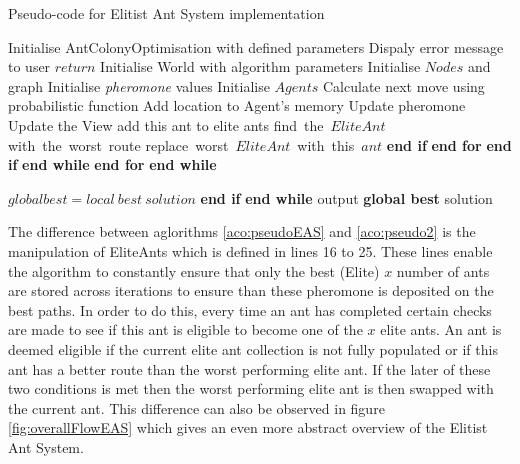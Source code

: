 \begin{algorithm}[H]
\caption[Eltist Ant System Pseudo-code]{Pseudo-code for Elitist Ant System implementation}
\label{aco:pseudoEAS}
\begin{algorithmic}[1]
\State Initialise AntColonyOptimisation with defined parameters
\State Dispaly error message to user
\State $return$
\EndIf
\State Initialise World with algorithm parameters
\State Initialise $Nodes$ and graph
\State Initialise \textit{pheromone} values
\State Initialise $Agents$
\State Calculate next move using probabilistic function 
\State Add location to Agent's memory
\State Update pheromone
\State Update the View
\EndWhile 
{}
\State add this ant to elite ants
\Else 
{}
\State find\ the\ $Elite Ant$ with\ the\ worst\ route
\State replace\ worst\ $Elite Ant$\ with\ this\ $ant$ 
\EndIf
\State \textbf{end if} 
\EndFor 
\State \textbf{end for}
\EndIf 
\State \textbf{end if}
\State \textbf{end while}
\EndFor 
\State \textbf{end for}
\EndWhile 
\State \textbf{end while}

\State $global best = local\ best\ solution$
\EndIf
\State \textbf{end if}
\State \textbf{end while}
\State output \textbf{global best} solution
\end{algorithmic}
\end{algorithm}
The difference between aglorithms \ref{aco:pseudoEAS} and \ref{aco:pseudo2} is the manipulation of EliteAnts which is defined in lines 16 to 25. These lines enable the algorithm to constantly ensure that only the best (Elite) $x$ number of ants are stored across iterations to ensure than these pheromone is deposited on the best paths. In order to do this, every time an ant has completed certain checks are made to see if this ant is eligible to become one of the $x$ elite ants. An ant is deemed eligible if the current elite ant collection is not fully populated or if this ant has a better route than the worst performing elite ant. If the later of these two conditions is met then the worst performing elite ant is then swapped with the current ant. This difference can also be observed in figure \ref{fig:overallFlowEAS} which gives an even more abstract overview of the Elitist Ant System.

